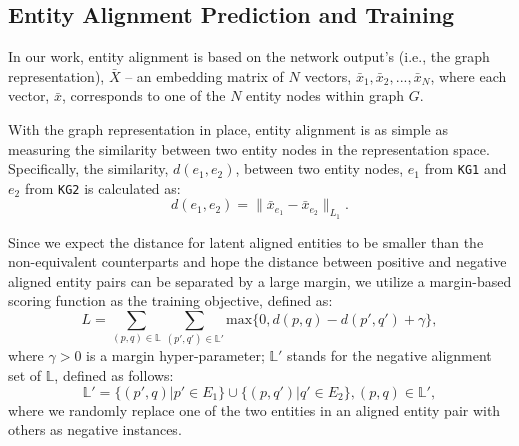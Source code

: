 	\subsection{Entity Alignment Prediction and Training\label{prediction}}
   In our work, entity alignment is based on the network output's (i.e., the graph representation), $\bar{X}$ -- an embedding matrix of $N$ vectors, $\bar{x}_1,\bar{x}_2,...,\bar{x}_N$, where
   each vector, $\bar{x}$, corresponds to one of the $N$ entity nodes within graph $G$. 	


 With the graph representation in place, entity alignment is as simple as measuring the similarity between two entity
nodes in the representation space. Specifically, the similarity, $d(e_1,e_2)$, between two entity nodes, $e_1$ from \texttt{KG1} and $e_2$
from \texttt{KG2} is calculated as:
	\begin{equation}
	\label{d}
	d(e_1,e_2)=\|\bar{x}_{e_1}-\bar{x}_{e_2}\|_{L_1}.
	\end{equation}

	 Since we expect the distance for latent aligned entities to be smaller than the non-equivalent counterparts and hope the distance
between positive and negative aligned entity pairs can be separated by a large margin, we utilize a margin-based scoring function as the
training objective, defined as:
	\begin{equation}
	L=\sum\limits_{(p,q)\in \mathbb{L}}\sum\limits_{(p',q')\in \mathbb{L'}}\mathrm{max}\{0,d(p,q)-d(p',q')+\gamma\},
	\end{equation}
	where $\gamma > 0$ is a margin hyper-parameter; $\mathbb{L'}$ stands for the negative alignment set of $\mathbb{L}$, defined as follows:
	\begin{equation}
	\mathbb{L'}=\{(p',q)|p'\in E_1\}\cup\{(p,q')|q'\in E_2\}, (p,q)\in \mathbb{L'},
	\end{equation}
	where we randomly replace one of the two entities in an aligned entity pair with others as negative instances.
	

	
	

	
	
